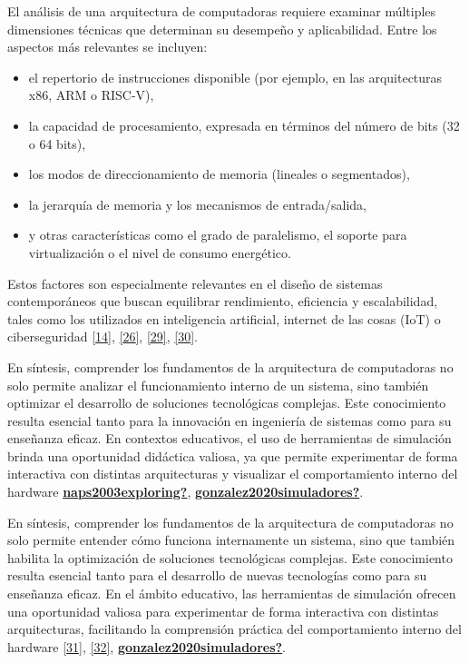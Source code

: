 \documentclass[12pt,oneside]{templates/unerthesis}
\providecommand{\tightlist}{%
  \setlength{\itemsep}{0pt}\setlength{\parskip}{0pt}}
\begin{document}
El análisis de una arquitectura de computadoras requiere examinar múltiples dimensiones técnicas que determinan su desempeño y aplicabilidad. Entre los aspectos más relevantes se incluyen:

\begin{itemize}
\tightlist
\item
  el repertorio de instrucciones disponible (por ejemplo, en las arquitecturas x86, ARM o RISC-V),
\item
  la capacidad de procesamiento, expresada en términos del número de bits (32 o 64 bits),
\item
  los modos de direccionamiento de memoria (lineales o segmentados),
\item
  la jerarquía de memoria y los mecanismos de entrada/salida,
\item
  y otras características como el grado de paralelismo, el soporte para virtualización o el nivel de consumo energético.
\end{itemize}

Estos factores son especialmente relevantes en el diseño de sistemas contemporáneos que buscan equilibrar rendimiento, eficiencia y escalabilidad, tales como los utilizados en inteligencia artificial, internet de las cosas (IoT) o ciberseguridad \protect\hyperlink{ref-stallings_computer_2013}{{[}14{]}}, \protect\hyperlink{ref-harris2015digital}{{[}26{]}}, \protect\hyperlink{ref-patterson2016computer}{{[}29{]}}, \protect\hyperlink{ref-belli2020iot}{{[}30{]}}.

En síntesis, comprender los fundamentos de la arquitectura de computadoras no solo permite analizar el funcionamiento interno de un sistema, sino también optimizar el desarrollo de soluciones tecnológicas complejas. Este conocimiento resulta esencial tanto para la innovación en ingeniería de sistemas como para su enseñanza eficaz. En contextos educativos, el uso de herramientas de simulación brinda una oportunidad didáctica valiosa, ya que permite experimentar de forma interactiva con distintas arquitecturas y visualizar el comportamiento interno del hardware \protect\hyperlink{ref-naps2003exploring}{\textbf{naps2003exploring?}}, \protect\hyperlink{ref-gonzalez2020simuladores}{\textbf{gonzalez2020simuladores?}}.

En síntesis, comprender los fundamentos de la arquitectura de computadoras no solo permite entender cómo funciona internamente un sistema, sino que también habilita la optimización de soluciones tecnológicas complejas. Este conocimiento resulta esencial tanto para el desarrollo de nuevas tecnologías como para su enseñanza eficaz. En el ámbito educativo, las herramientas de simulación ofrecen una oportunidad valiosa para experimentar de forma interactiva con distintas arquitecturas, facilitando la comprensión práctica del comportamiento interno del hardware \protect\hyperlink{ref-menchonherramientas}{{[}31{]}}, \protect\hyperlink{ref-rosslingexploring}{{[}32{]}}, \protect\hyperlink{ref-gonzalez2020simuladores}{\textbf{gonzalez2020simuladores?}}.
\end{document}
